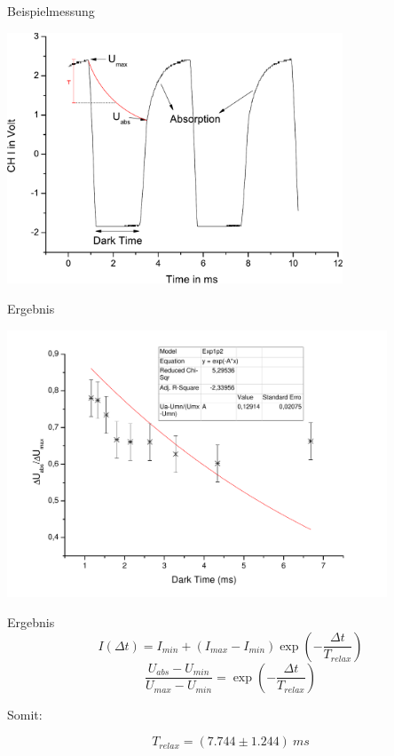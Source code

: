\documentclass{beamer}
\begin{document}
\begin{frame}{Beispielmessung}
\begin{center}
\centering \includegraphics[width=0.75\textwidth]{Bilder/FranzenBsp.pdf}
\end{center}
\end{frame}

\begin{frame}{Ergebnis}
\begin{center}
\centering \includegraphics[width=0.85\textwidth]{Bilder/Franzen.pdf}
\end{center}
\end{frame}

\begin{frame}{Ergebnis}
$$I(\Delta t) = I_{min} + (I_{max}-I_{min})\exp\left(-\frac{\Delta t}{T_{relax}}\right)$$ %
$$\frac{U_{abs}-U_{min}}{U_{max}-U_{min}} = \exp\left(-\frac{\Delta t}{T_{relax}}\right)$$

Somit:

$$T_{relax} = (7.744 \pm 1.244)\ ms$$ %

\end{frame}
\end{document}
